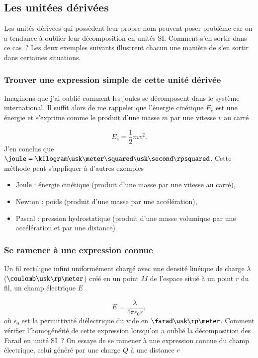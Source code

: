 \documentclass[12pt]{book}
\begin{document}
\subsection{Les unitées dérivées}
Les unités dérivées qui possèdent leur propre nom peuvent poser problème car 
on a tendance à oublier leur décomposition en unités SI.
Comment s'en sortir dans ce cas~? Les deux exemples
suivants illustrent chacun une manière de s’en sortir dans certaines
situations. 

\subsubsection{Trouver une expression simple de cette unité dérivée}
Imaginons que j'ai oublié comment les joules se décomposent dans le système international.
Il suffit alors de me rappeler que l'énergie cinétique $E_c$ est une énergie et s'exprime
comme le produit d'une masse $m$ par une vitesse $v$ au carré

\begin{equation*}
	E_c = \dfrac{1}{2} m v^2.
\end{equation*}
J'en conclus que 
$\joule = \kilogram \usk \meter \squared \usk \second \rpsquared$. Cette méthode 
peut s'appliquer à d'autres exemples
\begin{itemize}
	\item Joule : énergie cinétique (produit d'une masse par une vitesse au carré),
	\item Newton : poids (produit d'une masse par une accélération),
	\item Pascal : pression hydrostatique (produit d'une masse volumique par une accélération et par une distance).
\end{itemize}

\subsubsection{Se ramener à une expression connue}
Un fil rectiligne infini uniformément chargé avec une densité linéïque de charge
$\lambda$ ($\coulomb \usk \rp \meter$) créé en un point $M$ de l'espace
situé à un point $r$ du fil, un champ électrique $E$

\begin{equation*}
	E = \dfrac{\lambda}{4 \pi \epsilon_0 r},
\end{equation*}
où $\epsilon_0$ est la permittivité diélectrique du vide en 
$\farad \usk \rp \meter$. Comment vérifier l'homogénéité de cette expression
lorsqu'on a oublié la décomposition des Farad en unité SI~? On essaye de se 
ramener à une expression connue du champ électrique, celui généré par une charge 
$Q$ à une distance $r$
\end{document}
